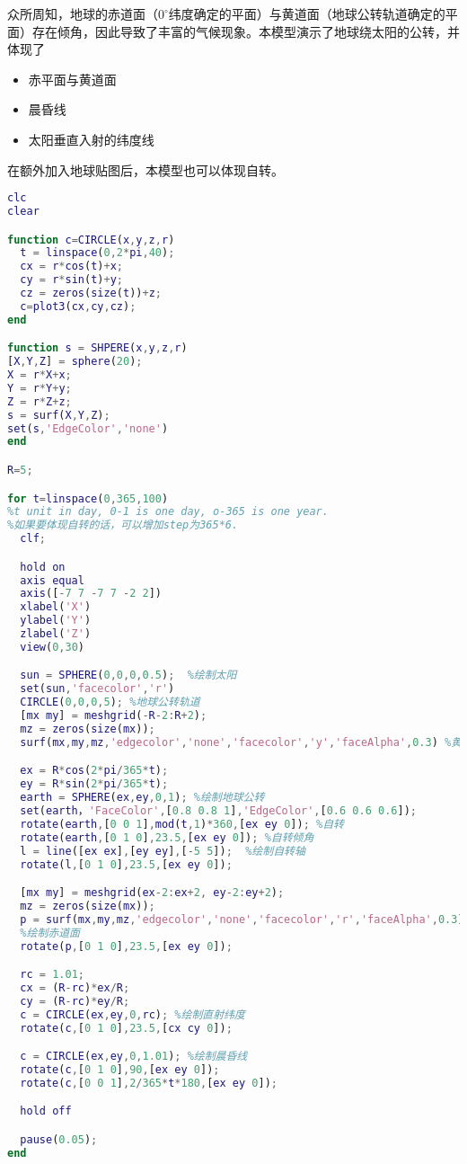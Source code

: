 
众所周知，地球的赤道面（$0 ^\circ$纬度确定的平面）与黄道面（地球公转轨道确定的平面）存在倾角，因此导致了丰富的气候现象。本模型演示了地球绕太阳的公转，并体现了
\begin{itemize}
\item 赤平面与黄道面
\item 晨昏线
\item 太阳垂直入射的纬度线
\end{itemize}
在额外加入地球贴图后，本模型也可以体现自转。

\begin{lstlisting}[language=matlab]
clc
clear

function c=CIRCLE(x,y,z,r)
  t = linspace(0,2*pi,40);
  cx = r*cos(t)+x;
  cy = r*sin(t)+y;
  cz = zeros(size(t))+z;
  c=plot3(cx,cy,cz);
end

function s = SHPERE(x,y,z,r)
[X,Y,Z] = sphere(20);
X = r*X+x;
Y = r*Y+y;
Z = r*Z+z;
s = surf(X,Y,Z);
set(s,'EdgeColor','none')
end

R=5;

for t=linspace(0,365,100) 
%t unit in day, 0-1 is one day, o-365 is one year.
%如果要体现自转的话，可以增加step为365*6.
  clf;

  hold on
  axis equal
  axis([-7 7 -7 7 -2 2])
  xlabel('X')
  ylabel('Y')
  zlabel('Z')
  view(0,30)

  sun = SPHERE(0,0,0,0.5);  %绘制太阳
  set(sun,'facecolor','r')
  CIRCLE(0,0,0,5); %地球公转轨道
  [mx my] = meshgrid(-R-2:R+2);
  mz = zeros(size(mx));
  surf(mx,my,mz,'edgecolor','none','facecolor','y','faceAlpha',0.3) %黄道面

  ex = R*cos(2*pi/365*t);
  ey = R*sin(2*pi/365*t);
  earth = SPHERE(ex,ey,0,1); %绘制地球公转
  set(earth，'FaceColor',[0.8 0.8 1],'EdgeColor',[0.6 0.6 0.6]);
  rotate(earth,[0 0 1],mod(t,1)*360,[ex ey 0]); %自转
  rotate(earth,[0 1 0],23.5,[ex ey 0]); %自转倾角
  l = line([ex ex],[ey ey],[-5 5]);  %绘制自转轴
  rotate(l,[0 1 0],23.5,[ex ey 0]);

  [mx my] = meshgrid(ex-2:ex+2, ey-2:ey+2);
  mz = zeros(size(mx));
  p = surf(mx,my,mz,'edgecolor','none','facecolor','r','faceAlpha',0.3);  
  %绘制赤道面
  rotate(p,[0 1 0],23.5,[ex ey 0]);

  rc = 1.01;
  cx = (R-rc)*ex/R;
  cy = (R-rc)*ey/R;
  c = CIRCLE(ex,ey,0,rc); %绘制直射纬度
  rotate(c,[0 1 0],23.5,[cx cy 0]);

  c = CIRCLE(ex,ey,0,1.01); %绘制晨昏线
  rotate(c,[0 1 0],90,[ex ey 0]);
  rotate(c,[0 0 1],2/365*t*180,[ex ey 0]);

  hold off

  pause(0.05);
end


\end{lstlisting}